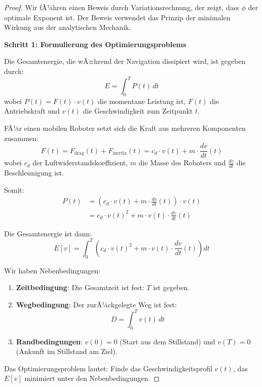 ﻿\documentclass[a4paper,12pt]{article}
\theoremstyle{definition}
\begin{document}
\begin{proof}
Wir fÃ¼hren einen Beweis durch Variationsrechnung, der zeigt, dass $\phi$ der optimale Exponent ist. Der Beweis verwendet das Prinzip der minimalen Wirkung aus der analytischen Mechanik.

\textbf{Schritt 1: Formulierung des Optimierungsproblems}

Die Gesamtenergie, die wÃ¤hrend der Navigation dissipiert wird, ist gegeben durch:
\begin{equation}
E = \int_0^T P(t) \, dt
\end{equation}
wobei $P(t) = F(t) \cdot v(t)$ die momentane Leistung ist, $F(t)$ die Antriebskraft und $v(t)$ die Geschwindigkeit zum Zeitpunkt $t$.

FÃ¼r einen mobilen Roboter setzt sich die Kraft aus mehreren Komponenten zusammen:
\begin{equation}
F(t) = F_{\text{drag}}(t) + F_{\text{inertia}}(t) = c_d \cdot v(t) + m \cdot \frac{dv}{dt}(t)
\end{equation}
wobei $c_d$ der Luftwiderstandskoeffizient, $m$ die Masse des Roboters und $\frac{dv}{dt}$ die Beschleunigung ist.

Somit:
\begin{align}
P(t) &= \left(c_d \cdot v(t) + m \cdot \frac{dv}{dt}(t)\right) \cdot v(t) \\
&= c_d \cdot v(t)^2 + m \cdot v(t) \cdot \frac{dv}{dt}(t)
\end{align}

Die Gesamtenergie ist dann:
\begin{equation}
E[v] = \int_0^T \left(c_d \cdot v(t)^2 + m \cdot v(t) \cdot \frac{dv}{dt}(t)\right) dt
\end{equation}

Wir haben Nebenbedingungen:
\begin{enumerate}
\item \textbf{Zeitbedingung}: Die Gesamtzeit ist fest: $T$ ist gegeben.
\item \textbf{Wegbedingung}: Der zurÃ¼ckgelegte Weg ist fest:
\begin{equation}
D = \int_0^T v(t) \, dt
\end{equation}
\item \textbf{Randbedingungen}: $v(0) = 0$ (Start aus dem Stillstand) und $v(T) = 0$ (Ankunft im Stillstand am Ziel).
\end{enumerate}

Das Optimierungsproblem lautet: Finde das Geschwindigkeitsprofil $v(t)$, das $E[v]$ minimiert unter den Nebenbedingungen.


\end{proof}
\end{document}
